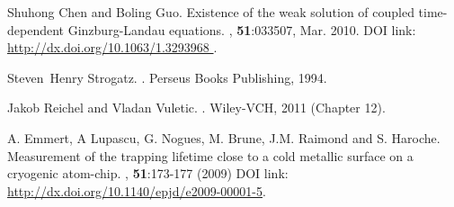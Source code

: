 \documentclass[a4paper,10pt]{article}
\begin{document}
\begin{thebibliography}{10}
Shuhong Chen and Boling Guo.
\newblock Existence of the weak solution of coupled time-dependent
  {G}inzburg-{L}andau equations.
, \textbf{51}:033507, Mar. 2010.
\newblock DOI link: \url{http://dx.doi.org/10.1063/1.3293968 }.

Steven~Henry Strogatz.
.
\newblock Perseus Books Publishing, 1994.

Jakob Reichel and Vladan Vuletic.
.
\newblock Wiley-VCH, 2011 (Chapter 12).

A. Emmert, A Lupascu, G. Nogues, M. Brune, J.M. Raimond and S. Haroche.
\newblock  Measurement of the trapping lifetime close to a cold metallic
surface on a cryogenic atom-chip.
, \textbf{51}:173-177 (2009)
\newblock DOI link: \url{http://dx.doi.org/10.1140/epjd/e2009-00001-5}.
\end{thebibliography}
\end{document}
